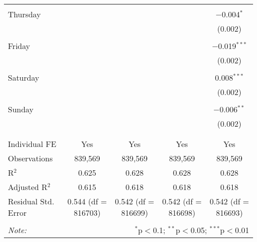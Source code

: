 \documentclass[
]{article}
\begin{document}
\begin{table}[!htbp]
{\begin{tabular}{@{\extracolsep{5pt}}lcccc}
  & & & & \\ 
 Thursday &  &  &  & $-$0.004$^{*}$ \\ 
  &  &  &  & (0.002) \\ 
  & & & & \\ 
 Friday &  &  &  & $-$0.019$^{***}$ \\ 
  &  &  &  & (0.002) \\ 
  & & & & \\ 
 Saturday &  &  &  & 0.008$^{***}$ \\ 
  &  &  &  & (0.002) \\ 
  & & & & \\ 
 Sunday &  &  &  & $-$0.006$^{**}$ \\ 
  &  &  &  & (0.002) \\ 
  & & & & \\ 
\hline \\[-1.8ex] 
Individual FE & Yes & Yes & Yes & Yes \\ 
Observations & 839,569 & 839,569 & 839,569 & 839,569 \\ 
R$^{2}$ & 0.625 & 0.628 & 0.628 & 0.628 \\ 
Adjusted R$^{2}$ & 0.615 & 0.618 & 0.618 & 0.618 \\ 
Residual Std. Error & 0.544 (df = 816703) & 0.542 (df = 816699) & 0.542 (df = 816698) & 0.542 (df = 816693) \\ 
\hline 
\hline \\[-1.8ex] 
\textit{Note:}  & \multicolumn{4}{r}{$^{*}$p$<$0.1; $^{**}$p$<$0.05; $^{***}$p$<$0.01} \\ 
\end{tabular}
} 
\end{table} 
\newpage
\end{document}
